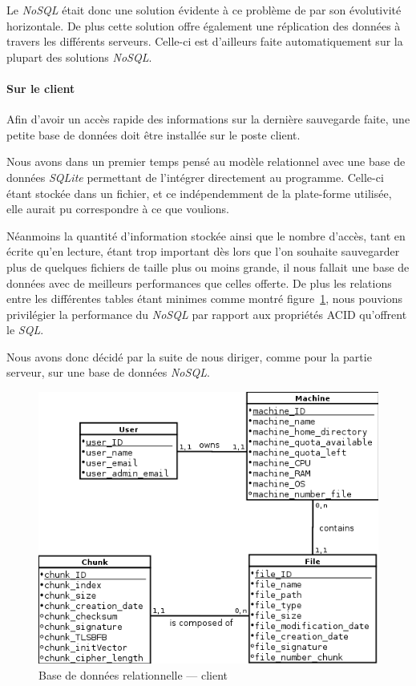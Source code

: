 \documentclass[a4paper,10pt, twoside]{report}
\begin{document}
\begin{spacing}{1.2}
Le \textit{NoSQL} \'etait donc une solution \'evidente \`a ce probl\`eme de par
son \'evolutivit\'e horizontale. De plus cette solution offre \'egalement une
r\'eplication des donn\'ees \`a travers les diff\'erents serveurs. Celle-ci
est d'ailleurs faite automatiquement sur la plupart des solutions
\textit{NoSQL}.

\paragraph{Sur le client}
Afin d'avoir un acc\`es rapide des informations sur la derni\`ere sauvegarde
faite, une petite base de donn\'ees doit \^etre install\'ee sur le poste client.

Nous avons dans un premier temps pens\'e au mod\`ele relationnel avec une base
de donn\'ees \textit{SQLite} permettant de l'int\'egrer directement au
programme. Celle-ci \'etant stock\'ee dans un fichier, et ce ind\'ependemment
de la plate-forme utilis\'ee, elle aurait pu correspondre \`a ce que voulions.

N\'eanmoins la quantit\'e d'information stock\'ee ainsi que le nombre d'acc\`es,
tant en \'ecrite qu'en lecture, \'etant trop important d\`es lors que l'on
souhaite sauvegarder plus de quelques fichiers de taille plus ou moins grande,
il nous fallait une base de donn\'ees avec de meilleurs performances que celles
offerte. De plus les relations entre les diff\'erentes tables \'etant minimes
comme montr\'e figure~\ref{dbRelClient}, nous pouvions privil\'egier la
performance du \textit{NoSQL} par rapport aux propri\'et\'es ACID qu'offrent
le \textit{SQL}.

Nous avons donc d\'ecid\'e par la suite de nous diriger, comme pour la partie
serveur, sur une base de donn\'ees \textit{NoSQL}.

\begin{figure}[h!]
  \centering
  \includegraphics[scale=0.69]{softwareDesign/dbRelClient.png}
  \caption{\label{dbRelClient} Base de donn\'ees relationnelle --- client}
\end{figure}


\end{spacing}
\end{document}
